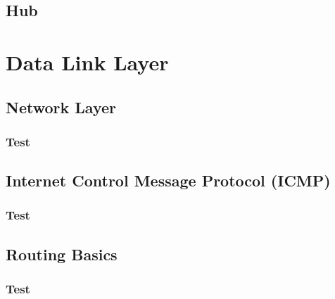 \documentclass[11pt]{article}
\begin{document}
\subsection{Hub}
\section{Data Link Layer}
\subsection{Network Layer}
\subsubsection{Test}
\subsection{Internet Control Message Protocol (ICMP)}
\subsubsection{Test}
\subsection{Routing Basics}
\subsubsection{Test}
\end{document}
